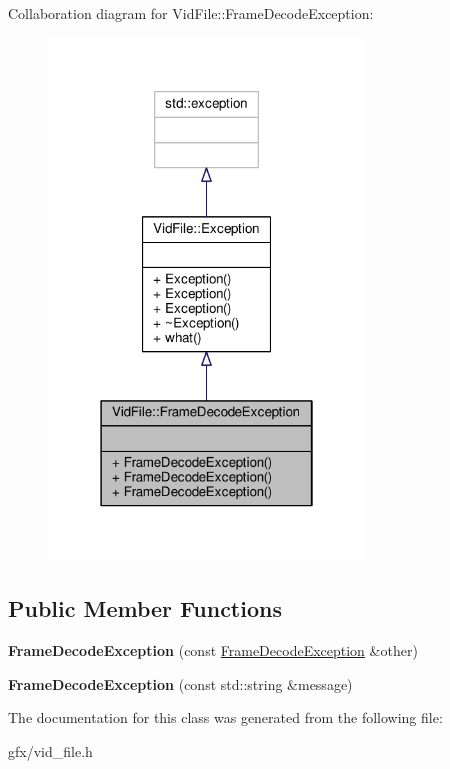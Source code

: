 Collaboration diagram for Vid\+File\+:\+:Frame\+Decode\+Exception\+:
\nopagebreak
\begin{figure}[H]
\begin{center}
\leavevmode
\includegraphics[width=238pt]{db/d7f/classVidFile_1_1FrameDecodeException__coll__graph}
\end{center}
\end{figure}
\subsection*{Public Member Functions}
\begin{DoxyCompactItemize}
\item 
{\bfseries Frame\+Decode\+Exception} (const \hyperlink{classVidFile_1_1FrameDecodeException}{Frame\+Decode\+Exception} \&other)\hypertarget{classVidFile_1_1FrameDecodeException_a717433f75d094eef5b883060c1b21b3a}{}\label{classVidFile_1_1FrameDecodeException_a717433f75d094eef5b883060c1b21b3a}

\item 
{\bfseries Frame\+Decode\+Exception} (const std\+::string \&message)\hypertarget{classVidFile_1_1FrameDecodeException_ab58234dc0effdabf73eeb80cedf729d4}{}\label{classVidFile_1_1FrameDecodeException_ab58234dc0effdabf73eeb80cedf729d4}

\end{DoxyCompactItemize}


The documentation for this class was generated from the following file\+:\begin{DoxyCompactItemize}
\item 
gfx/vid\+\_\+file.\+h\end{DoxyCompactItemize}
